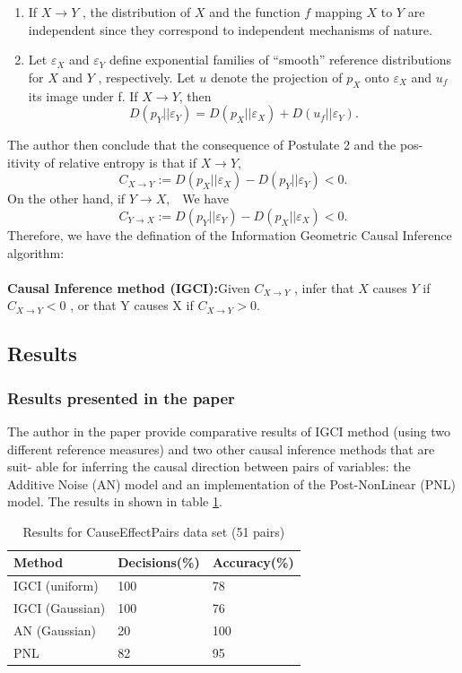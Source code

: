 \documentclass{article}
\theoremstyle{definition}
\numberwithin{equation}{section}
\numberwithin{figure}{section}
\begin{document}
\begin{enumerate}
\item If $X \rightarrow Y$ , the distribution of $X$ and the function $f$
mapping $X$ to $Y$ are independent since they correspond
to independent mechanisms of nature.
\item Let $\varepsilon_X$ and $\varepsilon_Y$ define exponential families of “smooth” reference distributions for $X$ and $Y$ , respectively. Let
$u$ denote the projection of $p_X$ onto $\varepsilon_X$ and $u_f$ its image under f. If $X \rightarrow Y$, then
\begin{equation}
D(p_Y||\varepsilon_Y)=D(p_X||\varepsilon_X)+D(u_f||\varepsilon_Y).
\end{equation}
\end{enumerate}
The author then conclude that the consequence of Postulate 2 and the pos-
itivity of relative entropy is that if $X \rightarrow Y$,
\begin{equation}
C_{X \rightarrow Y}:=D(p_X||\varepsilon_X)-D(p_Y||\varepsilon_Y)<0.
\end{equation}
On the other hand, if $Y \rightarrow X$,　We have
\begin{equation}
C_{Y \rightarrow X}:=D(p_Y||\varepsilon_Y)-D(p_X||\varepsilon_X)<0.
\end{equation}
Therefore, we have the defination of the Information Geometric Causal
Inference algorithm:\\\\
\textbf{Causal Inference method (IGCI):}Given $C_{X \rightarrow Y}$ ,
infer that $X$ causes $Y$ if $C_{X \rightarrow Y}<0$ , or that Y causes
X if $C_{X \rightarrow Y}>0$.



\subsection{Results}
\subsubsection{Results presented in the paper}
The author in the paper provide comparative results of
IGCI method (using two different reference measures)
and two other causal inference methods that are suit-
able for inferring the causal direction between pairs
of variables: the Additive Noise (AN) model and an implementation of the Post-NonLinear (PNL) model. The results in shown in table \ref{table1}.
\begin{table}[htbp]
\centering
\caption{Results for CauseEffectPairs data set (51 pairs)}
\label{table1}
\begin{tabular}{lll}
\hline
 Method& Decisions(\%) & Accuracy(\%)   \\ \hline
 IGCI (uniform)& 100& 78\\
 IGCI (Gaussian)& 100& 76\\
 AN (Gaussian)& 20& 100\\
 PNL& 82& 95
\end{tabular}
\end{table}
\end{document}
